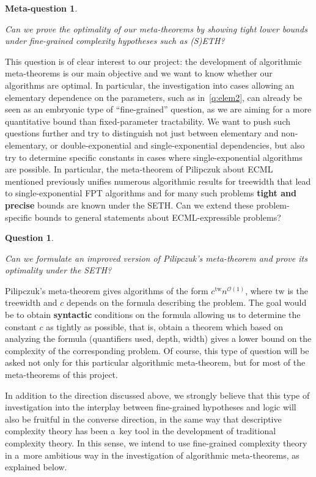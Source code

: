 \documentclass[a4paper,11pt]{article}
\newcommand{\Oh}{\mathcal{O}}
\newtheorem{quest}{Question}
\newenvironment{question}
  {\begin{quest}\begin{mdframed}[style=questionstyle]}
  {\end{mdframed}\end{quest}}
\newtheorem{metaquest}{Meta-question}
\newenvironment{metaquestion}
  {\begin{metaquest}\begin{mdframed}[style=metaquestionstyle]}
  {\end{mdframed}\end{metaquest}}
\newcommand{\florian}[1]{\noindent{\bf {\color{yellow!60!black}{\sc Flo:}  #1}}}
\begin{document}
\begin{metaquestion}
  Can we prove the optimality of our meta-theorems by showing tight lower bounds under fine-grained complexity hypotheses such as (S)ETH?
\end{metaquestion}

This question is of clear interest to our project: the development of
algorithmic meta-theorems is our main objective and we want to know whether our
algorithms are optimal. In particular, the investigation into cases allowing an
elementary dependence on the parameters, such as in~\cref{q:elem2}, can already be seen as an embryonic type of ``fine-grained''
question, as we are aiming for a more quantitative bound than fixed-parameter
tractability. We want to push such questions further and try to distinguish not
just between elementary and non-elementary, or double-exponential and
single-exponential dependencies, but also try to determine specific constants
in cases where single-exponential algorithms are possible.  In particular, the
meta-theorem of Pilipczuk about ECML mentioned previously unifies numerous
algorithmic results for treewidth that lead to single-exponential FPT
algorithms and for many such problems \textbf{tight and precise} bounds are
known under the SETH. Can we extend these problem-specific bounds to general
statements about ECML-expressible problems?

\begin{question}
    Can we formulate an improved version of Pilipczuk's meta-theorem and prove its optimality under the SETH?
\end{question}

Pilipczuk's meta-theorem gives algorithms of the form
$c^{\textrm{tw}}n^{\Oh(1)}$, where $\textrm{tw}$ is the treewidth and $c$
depends on the formula describing the problem. The goal would be to obtain
\textbf{syntactic} conditions on the formula allowing us to determine the
constant $c$ as tightly as possible, that is, obtain a theorem which based on
analyzing the formula (quantifiers used, depth, width) gives a lower bound on
the complexity of the corresponding problem. Of course, this type of question
will be asked not only for this particular algorithmic meta-theorem, but for
most of the meta-theorems of this project.

In addition to the direction discussed above, we strongly believe that this type of investigation into the interplay between fine-grained hypotheses and logic will also be fruitful in the converse direction, in the same way that descriptive complexity theory has been a~key tool in the development of traditional complexity theory.
In this sense, we intend to use fine-grained complexity theory in a~more ambitious way in the investigation of algorithmic meta-theorems, as explained below.
\end{document}
